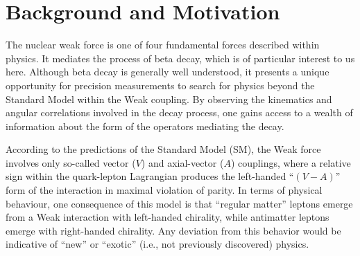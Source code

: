 


%
%
%
%
%
%
%
\section{Background and Motivation}
The nuclear weak force is one of four fundamental forces described within physics.  It mediates the process of beta decay, which is of particular interest to us here.  Although beta decay is generally well understood, it presents a unique opportunity for precision measurements to search for physics beyond the Standard Model within the Weak coupling.  By observing the kinematics and angular correlations involved in the decay process, one gains access to a wealth of information about the form of the operators mediating the decay.  

According to the predictions of the Standard Model (SM), the Weak force involves only so-called vector ($V$) and axial-vector ($A$) couplings, where a relative sign within the quark-lepton Lagrangian produces the left-handed ``$(V-A)$'' form of the interaction in maximal violation of parity.  In terms of physical behaviour, one consequence of this model is that ``regular matter'' leptons emerge from a Weak interaction with left-handed chirality, while antimatter leptons emerge with right-handed chirality. Any deviation from this behavior would be indicative of ``new'' or ``exotic'' (i.e., not previously discovered) physics.  

